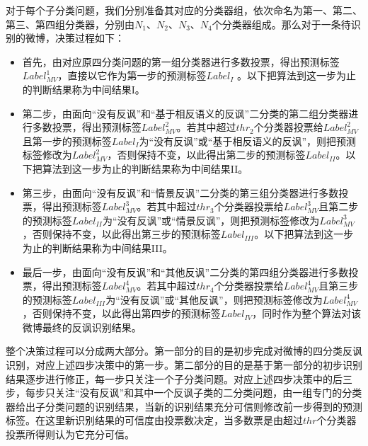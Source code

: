 对于每个子分类问题，我们分别准备其对应的分类器组，依次命名为第一、第二、第三、第四组分类器，分别由$N_1$、$N_2$、$N_3$、$N_4$个分类器组成。那么对于一条待识别的微博，决策过程如下：

\begin{itemize}

\item 首先，由对应原四分类问题的第一组分类器进行多数投票，得出预测标签$Label^{1}_{MV}$，直接以它作为第一步的预测标签$Label_{I}$ 。以下把算法到这一步为止的判断结果称为中间结果I。

\item 第二步，由面向“没有反讽”和“基于相反语义的反讽”二分类的第二组分类器进行多数投票，得出预测标签$Label^{2}_{MV}$。若其中超过$thr_{2}$个分类器投票给$Label^{2}_{MV}$且第一步的预测标签$Label_{I}$为“没有反讽”或“基于相反语义的反讽”，则把预测标签修改为$Label^{2}_{MV}$，否则保持不变，以此得出第二步的预测标签$Label_{II}$。以下把算法到这一步为止的判断结果称为中间结果II。

\item 第三步，由面向“没有反讽”和“情景反讽”二分类的第三组分类器进行多数投票，得出预测标签$Label^{3}_{MV}$。若其中超过$thr_{3}$个分类器投票给$Label^{3}_{MV}$且第二步的预测标签$Label_{II}$为“没有反讽”或“情景反讽”，则把预测标签修改为$Label^{3}_{MV}$，否则保持不变，以此得出第三步的预测标签$Label_{III}$。以下把算法到这一步为止的判断结果称为中间结果III。

\item 最后一步，由面向“没有反讽”和“其他反讽”二分类的第四组分类器进行多数投票，得出预测标签$Label^{4}_{MV}$。若其中超过$thr_{4}$个分类器投票给$Label^{4}_{MV}$且第三步的预测标签$Label_{III}$为“没有反讽”或“其他反讽”，则把预测标签修改为$Label^{4}_{MV}$，否则保持不变，以此得出第四步的预测标签$Label_{IV}$，同时作为整个算法对该微博最终的反讽识别结果。

\end{itemize}

整个决策过程可以分成两大部分。第一部分的目的是初步完成对微博的四分类反讽识别，对应上述四步决策中的第一步。第二部分的目的是基于第一部分的初步识别结果逐步进行修正，每一步只关注一个子分类问题。对应上述四步决策中的后三步，每步只关注“没有反讽”和其中一个反讽子类的二分类问题，由一组专门的分类器给出子分类问题的识别结果，当新的识别结果充分可信则修改前一步得到的预测标签。在这里新识别结果的可信度由投票数决定，当多数票是由超过$thr$个分类器投票所得则认为它充分可信。

